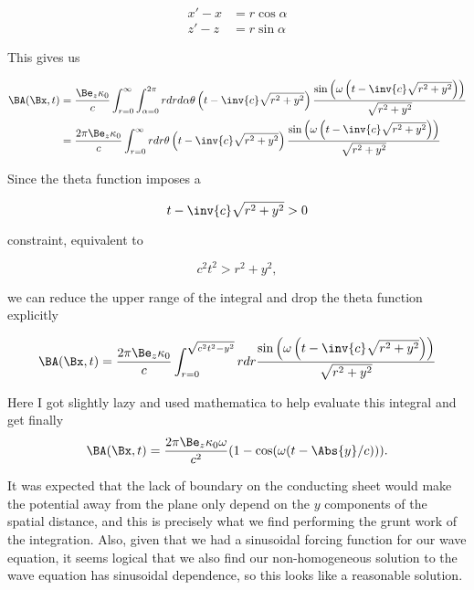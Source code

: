 \begin{align}\label{eqn:relElectroDynProblemSet5P1:n}
x' - x &= r \cos\alpha \\
z' - z &= r \sin\alpha 
\end{align}

This gives us

\begin{align*}
\BA(\Bx, t) 
&= \frac{
\Be_z \kappa_0
}{c} \int_{r=0}^\infty \int_{\alpha=0}^{2\pi} r dr d\alpha
\theta\left(t - \inv{c} \sqrt{r^2 + y^2}\right) 
\frac{\sin\left(\omega\left(t - \inv{c} \sqrt{r^2 + y^2 }\right)\right)}{\sqrt{r^2 + y^2}} \\
&= \frac{
2 \pi \Be_z \kappa_0
}{c} \int_{r=0}^\infty r dr 
\theta\left(t - \inv{c} \sqrt{r^2 + y^2}\right) 
\frac{\sin\left(\omega\left(t - \inv{c} \sqrt{r^2 + y^2 }\right)\right)}{\sqrt{r^2 + y^2}} \\
\end{align*}

Since the theta function imposes a 

\begin{equation}\label{eqn:relElectroDynProblemSet5P1:n}
t - \inv{c} \sqrt{r^2 + y^2 } > 0
\end{equation}

constraint, equivalent to

\begin{equation}\label{eqn:relElectroDynProblemSet5P1:n}
c^2 t^2 > r^2 + y^2,
\end{equation}

we can reduce the upper range of the integral and drop the theta function explicitly

\begin{equation}\label{eqn:relElectroDynProblemSet5P1:n}
\BA(\Bx, t) 
= \frac{
2 \pi \Be_z \kappa_0
}{c} \int_{r=0}^{\sqrt{c^2 t^2 - y^2}} r dr 
\frac{\sin\left(\omega\left(t - \inv{c} \sqrt{r^2 + y^2 }\right)\right)}{\sqrt{r^2 + y^2}} 
\end{equation}

Here I got slightly lazy and used mathematica to help evaluate this integral and get finally
\begin{equation}\label{eqn:relElectroDynProblemSet5P1:n}
\BA(\Bx, t) 
= \frac{
2 \pi \Be_z \kappa_0 \omega
}{c^2} (1 - \cos(\omega(t - \Abs{y}/c))).
\end{equation}

It was expected that the lack of boundary on the conducting sheet would make the potential away from the plane only depend on the $y$ components of the spatial distance, and this is precisely what we find performing the grunt work of the integration.  Also, given that we had a sinusoidal forcing function for our wave equation, it seems logical that we also find our non-homogeneous solution to the wave equation has sinusoidal dependence, so this looks like a reasonable solution.

